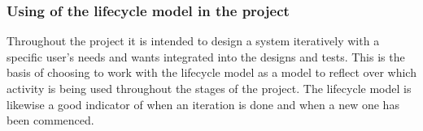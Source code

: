 \subsubsection{Using of the lifecycle model in the project}
Throughout the project it is intended to design a system iteratively with a specific user’s needs and wants integrated into the designs and tests. This is the basis of choosing to work with the lifecycle model as a model to reflect over which activity is being used throughout the stages of the project. The lifecycle model is likewise a good indicator of when an iteration is done and when a new one has been commenced.





